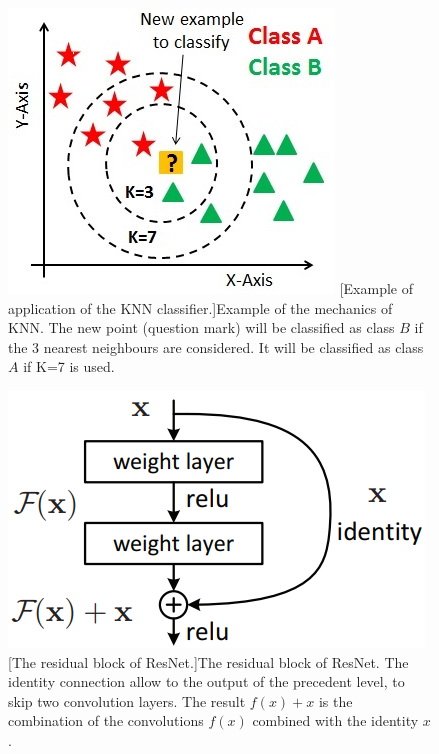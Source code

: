 \begin{figure}
	\centering
	\begin{minipage}{.44\textwidth}
		\centering
		\includegraphics[width=1\linewidth]{images/recognition/howItWorks_knn}
		\captionsetup{margin=0.5cm}
		[Example of application of the KNN classifier.]{Example of the mechanics of KNN. The new point (question mark) will be classified as class $B$ if the 3 nearest neighbours are considered. It will be classified as class $A$ if K=7 is used.}
		\label{fig:howItWorks_knn}
	\end{minipage}
	\begin{minipage}{.54\textwidth}
		\centering
		\includegraphics[width=1\linewidth]{images/recognition/howItWorks_resNet}
		\captionsetup{margin=0.5cm}
		[The residual block of ResNet.]{The residual block of ResNet. The identity connection allow to the output of the precedent level, to skip two convolution layers. The result $f(x)+x$ is the combination of the convolutions $f(x)$ combined with the identity $x$.}
		\label{fig:howItWorks_resNet}
	\end{minipage}
\end{figure}


